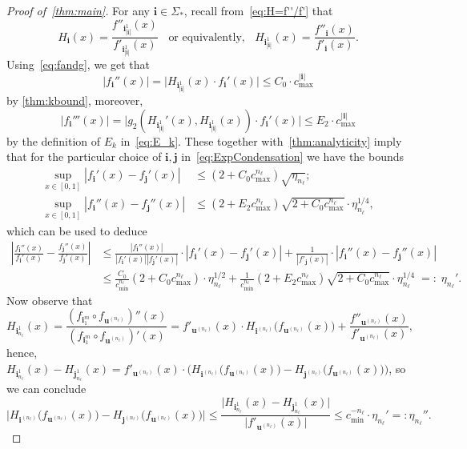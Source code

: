 \documentclass[12pt,]{article}
\def\cref#1{\ref{#1}}%
\theoremstyle{definition}
\theoremstyle{remark}
\newcommand{\0}{\mathbf{0}}
\newcommand{\bi}{\mathbf{i}}
\newcommand{\bj}{\mathbf{j}}
\newcommand{\bu}{\mathbf{u}}
\begin{document}
{\begin{proof}[Proof of~\cref{thm:main}]
For any $\bi\in\Sigma_*$, recall from~\cref{eq:H=f''/f'} that
\begin{equation*}
	H_{\bi}(x)= \frac{f''_{\bi_{|\bi|}^1}(x)}{f'_{\bi_{|\bi|}^1}(x)} \;\;\text{ or equivalently,
	}\;\; H_{\bi_{|\bi|}^1}(x) = \frac{f''_{\bi}(x)}{f'_{\bi}(x)}.
\end{equation*}
Using~\eqref{eq:fandg}, we get that
\begin{equation*}
 |f_{\bi}''(x)| = \big|H_{\bi_{|\bi|}^1}(x)\cdot f_{\bi}'(x)\big|\leq C_0 \cdot c_{\max}^{|\bi|}
\end{equation*}
by \cref{thm:kbound}, moreover,
\begin{equation*}
  |f_{\bi}'''(x)| = \big|g_2(H_{\bi_{|\bi|}^1}'(x),H_{\bi_{|\bi|}^1}(x))\cdot f_{\bi}'(x)\big| \leq
  E_2\cdot c_{\max}^{|\bi|}
\end{equation*}
by the definition of $E_k$ in~\cref{eq:E_k}. These together with~\cref{thm:analyticity} imply that
for the particular choice of $\bi,\bj$ in~\cref{eq:ExpCondensation} we have the bounds
\begin{align*}
 \sup_{x\in[0,1]}|f_{\bi}'(x) - f_{\bj}'(x)| &\leq (2+C_0 c_{\max}^{n_\ell})\sqrt{\eta_{n_\ell}}; \\
 \sup_{x\in[0,1]}|f_{\bi}''(x) - f_{\bj}''(x)| &\leq (2+E_2c_{\max}^{n_\ell})\sqrt{2+C_0
 	c_{\max}^{n_\ell}}\cdot
 \eta_{n_\ell}^{1/4},
\end{align*}
which can be used to deduce
\begin{align*}
	\left|\frac{f_{\bi}''(x)}{f_{\bi}'(x)} - \frac{f_{\bj}''(x)}{f_{\bj}'(x)}\right|
	&\leq
	\frac{|f_{\bi}''(x)|}{|f_{\bi}'(x)||f_{\bj}'(x)|}\cdot|f_{\bi}'(x) - f_{\bj}'(x)|
	+\frac{1}{|f'_{\bj}(x)|} \cdot |f_{\bi}''(x) - f_{\bj}''(x)|
	\\
	&
	\leq \frac{C_0}{c_{\min}^{n_\ell}}(2+C_0c_{\max}^{n_\ell})\cdot \eta_{n_\ell}^{1/2}
	+\frac{1}{c_{\min}^{n_\ell}}(2+E_2
	c_{\max}^{n_\ell})\sqrt{2+C_0 c_{\max}^{n_\ell}} \cdot \eta_{n_\ell}^{1/4} \;=:\;\eta_{n_\ell}'.
\end{align*}
Now observe that
\begin{equation*}
H_{\bi_{n_{\ell}}^1}(x) = \frac{(f_{\bi_1^m}\circ f_{\bu^{(n_{\ell})}})''(x)}{(f_{\bi_1^m}\circ
f_{\bu^{(n_{\ell})}})'(x)} = 
f'_{\bu^{(n_{\ell})}}(x) \cdot H_{\bi^{(n_{\ell})}} \big(f_{\bu^{(n_{\ell})}}(x)\big) + \frac{
f''_{\bu^{(n_{\ell})}}(x) }{ f'_{\bu^{(n_{\ell})}}(x)},
\end{equation*}
hence, $H_{\bi_{n_{\ell}}^1}(x)-H_{\bj_{n_{\ell}}^1}(x) = f'_{\bu^{(n_{\ell})}}(x) \cdot \big(
H_{\bi^{(n_{\ell})}} \big(f_{\bu^{(n_{\ell})}}(x)\big) -H_{\bj^{(n_{\ell})}}
\big(f_{\bu^{(n_{\ell})}}(x)\big) \big)$, so we can conclude
\[
\big| H_{\bi^{(n_{\ell})}} \big(f_{\bu^{(n_{\ell})}}(x)\big) -H_{\bj^{(n_{\ell})}}
\big(f_{\bu^{(n_{\ell})}}(x)\big) \big|
 \leq
 \frac{\big|H_{\bi_{n_{\ell}}^1}(x)-H_{\bj_{n_{\ell}}^1}(x)\big|}{\big|f'_{\bu^{(n_{\ell})}}(x)\big|}
 \leq c_{\min}^{-{n_\ell}}
\cdot \eta_{n_\ell}'
=:\eta_{n_\ell}''.
\]


\end{proof}}
\end{document}

